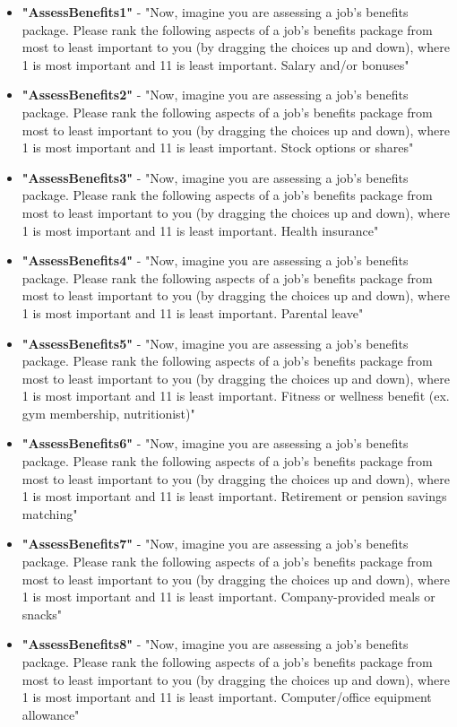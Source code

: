 \begin{appendices}
\begin{itemize}
        \item \textbf{"AssessBenefits1"} - "Now, imagine you are assessing a job's benefits package. Please rank the following aspects of a job's benefits package from most to least important to you (by dragging the choices up and down), where 1 is most important and 11 is least important. Salary and/or bonuses"
        \item \textbf{"AssessBenefits2"} - "Now, imagine you are assessing a job's benefits package. Please rank the following aspects of a job's benefits package from most to least important to you (by dragging the choices up and down), where 1 is most important and 11 is least important. Stock options or shares"
        \item \textbf{"AssessBenefits3"} - "Now, imagine you are assessing a job's benefits package. Please rank the following aspects of a job's benefits package from most to least important to you (by dragging the choices up and down), where 1 is most important and 11 is least important. Health insurance"
        \item \textbf{"AssessBenefits4"} - "Now, imagine you are assessing a job's benefits package. Please rank the following aspects of a job's benefits package from most to least important to you (by dragging the choices up and down), where 1 is most important and 11 is least important. Parental leave"
        \item \textbf{"AssessBenefits5"} - "Now, imagine you are assessing a job's benefits package. Please rank the following aspects of a job's benefits package from most to least important to you (by dragging the choices up and down), where 1 is most important and 11 is least important. Fitness or wellness benefit (ex. gym membership, nutritionist)"
        \item \textbf{"AssessBenefits6"} - "Now, imagine you are assessing a job's benefits package. Please rank the following aspects of a job's benefits package from most to least important to you (by dragging the choices up and down), where 1 is most important and 11 is least important. Retirement or pension savings matching"
        \item \textbf{"AssessBenefits7"} - "Now, imagine you are assessing a job's benefits package. Please rank the following aspects of a job's benefits package from most to least important to you (by dragging the choices up and down), where 1 is most important and 11 is least important. Company-provided meals or snacks"
        \item \textbf{"AssessBenefits8"} - "Now, imagine you are assessing a job's benefits package. Please rank the following aspects of a job's benefits package from most to least important to you (by dragging the choices up and down), where 1 is most important and 11 is least important. Computer/office equipment allowance"

\end{itemize}
\end{appendices}
